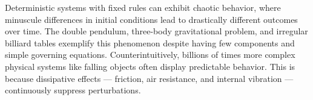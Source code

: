 Deterministic systems with fixed rules can exhibit chaotic behavior, where minuscule differences in initial conditions lead to drastically different outcomes over time. The double pendulum, three-body gravitational problem, and irregular billiard tables exemplify this phenomenon despite having few components and simple governing equations. Counterintuitively, billions of times more complex physical systems like falling objects often display predictable behavior. This is because dissipative effects — friction, air resistance, and internal vibration — continuously suppress perturbations.
